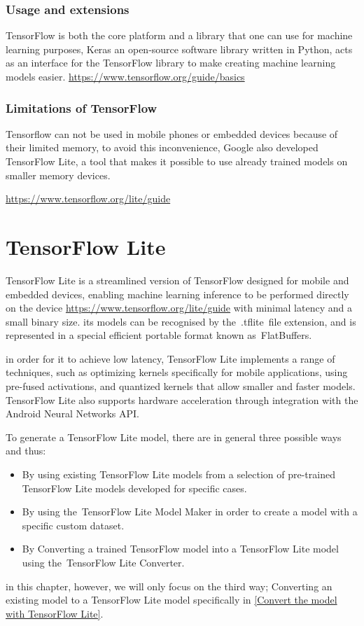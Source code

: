 \subsubsection{Usage and extensions}
TensorFlow is both the core platform and a library that one can use for machine learning purposes, Keras an open-source software library written in Python, acts as an interface for the TensorFlow library to make creating machine learning models easier.
\url{https://www.tensorflow.org/guide/basics}
\subsubsection{Limitations of TensorFlow}

Tensorflow can not be used in mobile phones or embedded devices because of their limited memory, to avoid this inconvenience, Google also developed TensorFlow Lite, a tool that makes it possible to use already trained models on smaller memory devices.

\url{https://www.tensorflow.org/lite/guide}

\section{TensorFlow Lite}
TensorFlow Lite is a streamlined version of TensorFlow designed for mobile and embedded devices, enabling machine learning inference to be performed directly on the device \url{https://www.tensorflow.org/lite/guide} with minimal latency and a small binary size. its models can be recognised by the .tflite file extension, and is represented in a special efficient portable format known as FlatBuffers.

in order for it to achieve low latency, TensorFlow Lite implements a range of techniques, such as optimizing kernels specifically for mobile applications, using pre-fused activations, and quantized kernels that allow smaller and faster models.
TensorFlow Lite also supports hardware acceleration through integration with the Android Neural Networks API. 

To generate a TensorFlow Lite model, there are in general three possible ways and thus:
\begin{itemize}
	\item By using existing TensorFlow Lite models from a selection of pre-trained TensorFlow Lite models developed for specific cases.
	\item By using the TensorFlow Lite Model Maker in order to create a model with a specific custom dataset. 
	\item By Converting a trained TensorFlow model into a TensorFlow Lite model using the TensorFlow Lite Converter.  
	
\end{itemize}
in this chapter, however, we will only focus on the third way; Converting an existing model to a TensorFlow Lite model specifically in \ref{Convert the model with TensorFlow Lite}.

